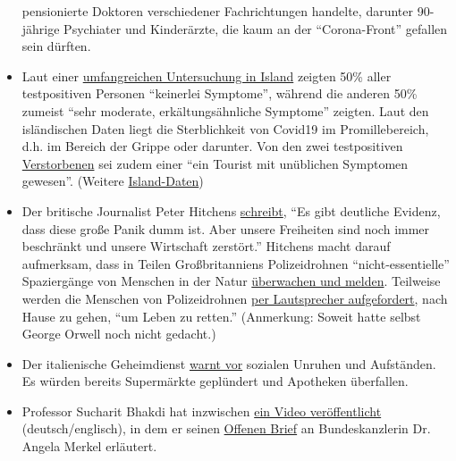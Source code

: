 \begin{itemize}
  pensionierte Doktoren verschiedener Fachrichtungen handelte, darunter
  90-jährige Psychiater und Kinderärzte, die kaum an der
  ``Corona-Front'' gefallen sein dürften.
\item
  Laut einer
  \href{https://www.buzzfeed.com/albertonardelli/coronavirus-testing-iceland}{umfangreichen
  Untersuchung in Island} zeigten 50\% aller testpositiven Personen
  ``keiner­lei Symptome'', während die anderen 50\% zumeist ``sehr
  moderate, erkältungsähnliche Symptome'' zeigten. Laut den isländischen
  Daten liegt die Sterblichkeit von Covid19 im Promille­bereich, d.h. im
  Bereich der Grippe oder darunter. Von den zwei testpositiven
  \href{https://www.government.is/news/article/?newsid=c65cf658-6eb6-11ea-9462-005056bc4d74}{Verstorbenen}
  sei zudem einer ``ein Tourist mit unüblichen Symptomen gewesen''.
  (Weitere \href{https://www.covid.is/data}{Island-Daten})
\item
  Der britische Journalist Peter Hitchens
  \href{https://hitchensblog.mailonsunday.co.uk/2020/03/theres-powerful-evidence-this-great-panic-is-foolish-yet-our-freedom-is-still-broken-and-our-economy.html}{schreibt},
  ``Es gibt deutliche Evidenz, dass diese große Panik dumm ist. Aber
  unsere Freiheiten sind noch immer beschränkt und unsere Wirtschaft
  zerstört.'' Hitchens macht darauf aufmerksam, dass in Teilen
  Großbritanniens Polizeidrohnen ``nicht-essentielle'' Spaziergänge von
  Menschen in der Natur
  \href{https://www.youtube.com/watch?v=fHNxDzLsPeg}{überwachen und
  melden}. Teilweise werden die Menschen von Polizeidrohnen
  \href{https://www.youtube.com/watch?v=D4GEZjUTkqc}{per Lautsprecher
  aufgefordert}, nach Hause zu gehen, ``um Leben zu retten.''
  (Anmerkung: Soweit hatte selbst George Orwell noch nicht gedacht.)
\item
  Der italienische Geheimdienst
  \href{https://www.focus.de/panorama/welt/sorge-vor-sozialen-unruhen-supermaerkte-gepluendert-apotheken-ueberfallen-italiens-geheimdienst-warnt-vor-aufstaenden_id_11826664.html}{warnt
  vor} sozialen Unruhen und Aufständen. Es würden bereits Supermärkte
  geplündert und Apotheken überfallen.
\item
  Professor Sucharit Bhakdi hat inzwischen
  \href{https://www.youtube.com/watch?v=LsExPrHCHbw\&feature=emb_title}{ein
  Video veröffentlicht} (deutsch/englisch), in dem er seinen
  \href{https://swprs.org/offener-brief-von-professor-sucharit-bhakdi-an-bundeskanzlerin-dr-angela-merkel/}{Offenen
  Brief} an Bundeskanzlerin Dr. Angela Merkel erläutert.
\end{itemize}

